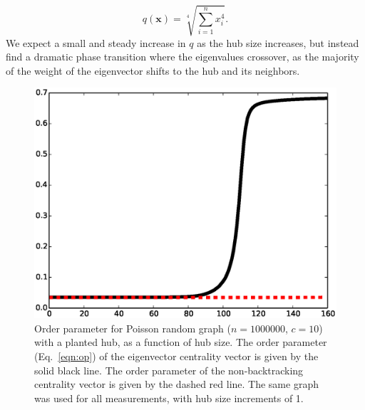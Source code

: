 \documentclass[twocolumn,prl,superscriptaddress]{revtex4}
\renewcommand{\vec}{\mathbf}
\begin{document}
\begin{equation}
q(\vec{x}) = \sqrt[4]{\sum_{i=1}^n x_i ^ 4}.
\label{eqn:op}
\end{equation}
We expect a small and steady increase in $q$ as the hub size increases, but instead find a dramatic phase transition where the eigenvalues crossover, as the majority of the weight of the eigenvector shifts to the hub and its neighbors.

\begin{figure}
\begin{center}
\includegraphics[width=\columnwidth]{op.eps}
\end{center}
\caption{Order parameter for Poisson random graph ($n=1000000$, $c=10$) with a planted hub, as a function of hub size. The order parameter (Eq.~\eqref{eqn:op}) of the eigenvector centrality vector is given by the solid black line. The order parameter of the non-backtracking centrality vector is given by the dashed red line. The same graph was used for all measurements, with hub size increments of 1.}
\label{fig:order-parameter}
\end{figure}
\end{document}
